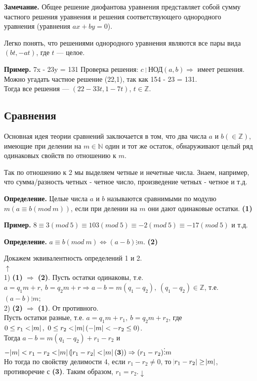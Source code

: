 \documentclass{article}
\begin{document}
    \textbf{Замечание.} Общее решение диофантова уравнения представляет собой сумму частного решения уравнения и решения соответствующего однородного уравнения (уравнения \( ax + by = 0 \)).

    Легко понять, что решениями однородного уравнения являются все пары вида \( (bt, -at) \), где \( t \) --- целое.

    \textbf{Пример.} 7x - 23y = 131
    Проверка решения: \( c\ \vdots \ \textrm{НОД}(a,b) \Rightarrow \) имеет решения.\\ 
    Можно угадать частное решение (22,1), так как 154 - 23 = 131.\\
    Тогда все решения --- \( (22-33t,1-7t) \), \( t \in \mathbb{Z} \).

    \subsection{Сравнения}

    Основная идея теории сравнений заключается в том, что два числа \( a \) и \( b (\in \mathbb{Z}) \), имеющие при делении на \( m \in \mathbb{N} \) один и тот же остаток, обнаруживают целый ряд одинаковых свойств по отношению к \( m \).

    Так по отношению к 2 мы выделяем четные и нечетные числа. Знаем, например, что сумма/разность четных - четное число, произведение четных - четное и т.д.

    \textbf{Определение.} Целые числа \( a \) и \( b \) называются сравнимыми по модулю \( m (a \equiv b (mod\ m)) \), если при делении на \( m \) они дают одинаковые остатки. \textbf{(1)}
    
    \textbf{Пример.} \( 8 \equiv 3 (mod\ 5) \equiv 103 (mod\ 5) \equiv -2 (mod\ 5) \equiv -17 (mod\ 5) \) и т.д.

    \textbf{Определение.} \( a \equiv b (mod\ m) \Leftrightarrow (a - b) \vdots m \). \textbf{(2)}

    Докажем эквивалентность определений 1 и 2.\\
    \( \uparrow \)\\
    1) \textbf{(1)} \( \Rightarrow \) \textbf{(2)}. Пусть остатки одинаковы, т.е. \( a = q_1m + r,\ b = q_2m + r \Rightarrow a - b = m(q_1 - q_2),\ (q_1 - q_2) \in \mathbb{Z} \), т.е. \( (a - b) \vdots m \);\\
    2) \textbf{(2)} \( \Rightarrow \) \textbf{(1)}. От противного.\\
    Пусть остатки разные, т.е. \( a = q_1m + r_1,\ b = q_2m + r_2 \), где \( 0 \leq r_1 < \abs{m},\ 0 \leq r_2 < \abs{m} (-\abs{m} < -r_2 \leq 0) \).\\
    Тогда \( a - b = m(q_1 - q_2) + r_1 - r_2 \) и \( -\abs{m} < r_1 - r_2 < \abs{m} (\abs{r_1 - r_2} < \abs{m} \mathbf{(3)}) \Rightarrow (r_1 - r_2) \vdots m \)\\
    Но тогда по свойству делимости 4, если \( r_1 - r_2 \neq 0 \), то \( \abs{r_1 - r_2} \geq \abs{m} \), противоречие с \textbf{(3)}. Таким образом, \(r_1 = r_2. \downarrow \)
\end{document}
